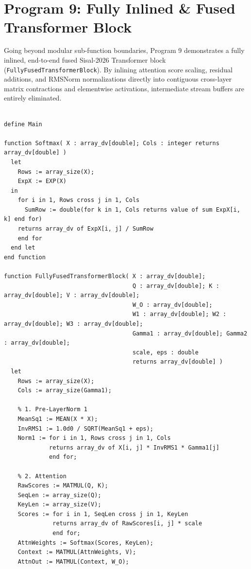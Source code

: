 \section{Program 9: Fully Inlined \& Fused Transformer Block}
Going beyond modular sub-function boundaries, Program 9 demonstrates a fully inlined, end-to-end fused Sisal-2026 Transformer block (\texttt{FullyFusedTransformerBlock}). By inlining attention score scaling, residual additions, and RMSNorm normalizations directly into contiguous cross-layer matrix contractions and elementwise activations, intermediate stream buffers are entirely eliminated.

\begin{lstlisting}[language=Sisal,caption={Fully Inlined \& Fused Transformer Block (\texttt{transformer\_fully\_inlined\_dv.sis})}]
% Sisal-2026 Fully Inlined & Fused Transformer Block

define Main

function Softmax( X : array_dv[double]; Cols : integer returns array_dv[double] )
  let
    Rows := array_size(X);
    ExpX := EXP(X)
  in
    for i in 1, Rows cross j in 1, Cols
      SumRow := double(for k in 1, Cols returns value of sum ExpX[i, k] end for)
    returns array_dv of ExpX[i, j] / SumRow
    end for
  end let
end function

function FullyFusedTransformerBlock( X : array_dv[double]; 
                                     Q : array_dv[double]; K : array_dv[double]; V : array_dv[double];
                                     W_O : array_dv[double];
                                     W1 : array_dv[double]; W2 : array_dv[double]; W3 : array_dv[double];
                                     Gamma1 : array_dv[double]; Gamma2 : array_dv[double];
                                     scale, eps : double 
                                     returns array_dv[double] )
  let
    Rows := array_size(X);
    Cols := array_size(Gamma1);
    
    % 1. Pre-LayerNorm 1
    MeanSq1 := MEAN(X * X);
    InvRMS1 := 1.0d0 / SQRT(MeanSq1 + eps);
    Norm1 := for i in 1, Rows cross j in 1, Cols
             returns array_dv of X[i, j] * InvRMS1 * Gamma1[j]
             end for;
             
    % 2. Attention
    RawScores := MATMUL(Q, K);
    SeqLen := array_size(Q);
    KeyLen := array_size(V);
    Scores := for i in 1, SeqLen cross j in 1, KeyLen
              returns array_dv of RawScores[i, j] * scale
              end for;
    AttnWeights := Softmax(Scores, KeyLen);
    Context := MATMUL(AttnWeights, V);
    AttnOut := MATMUL(Context, W_O);
    

\end{lstlisting}

